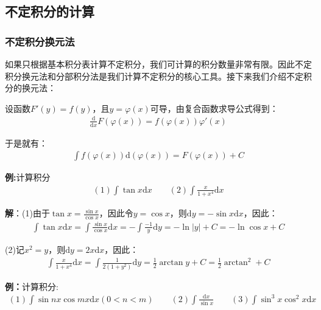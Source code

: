 \documentclass{ctexart}
\let\oldtextbf\textbf %
\renewcommand{\textbf}[1]{\textcolor{btex}{\oldtextbf{#1}}} %
\begin{document}
\subsection{不定积分的计算}
\subsubsection{不定积分换元法}
如果只根据基本积分表计算不定积分，我们可计算的积分数量非常有限。因此不定积分换元法和分部积分法是我们计算不定积分的核心工具。接下来我们介绍不定积分的换元法：
\begin{tcolorbox}[
    colback=bac1,     %
    colframe=fra1,   %
    coltitle=white,             %
    coltext=tex1,
    title=不定积分第一换元法,
    fonttitle=\bfseries,        %
arc=3mm,                     %
breakable
]
设函数$F'(y)=f(y)$，且$y=\varphi(x)$可导，由复合函数求导公式得到：
\begin{align*}
    \frac{\mathrm{d}}{\mathrm{d}x}F(\varphi(x))=f(\varphi(x))\varphi'(x)
\end{align*}

于是就有：
\begin{align*}
    \int f(\varphi(x))\mathrm{d}(\varphi(x))=F(\varphi(x))+C
\end{align*}
\end{tcolorbox}

\textbf{例:}计算积分
\begin{align*}
    (1)\int \tan x\mathrm{d}x\qquad (2)\int\frac{x}{1+x^4}\mathrm{d}x
\end{align*}

\textbf{解}：(1)由于$\tan x=\frac{\sin x}{\cos x}$，因此令$y=\cos x$，则$\mathrm{d}y=-\sin x\mathrm{d}x$，因此：
\begin{align*}
    \int \tan x\mathrm{d}x=\int\frac{\sin x}{\cos x}\mathrm{d}x=-\int\frac{-1}{y}\mathrm{d}y=-\ln |y|+C=-\ln \cos x+C
\end{align*}

(2)记$x^2=y$，则$\mathrm{d}y=2x\mathrm{d}x$，因此：
\begin{align*}
    \int\frac{x}{1+x^4}\mathrm{d}x=\int\frac{1}{2(1+y^2)}\mathrm{d}y=\frac{1}{2}\arctan y+C=\frac{1}{2}\arctan ^2+C
\end{align*}

\textbf{例：}计算积分:
\begin{align*}
    (1)\int \sin nx\cos mx\mathrm{d}x(0<n<m)\qquad(2)\int\frac{\mathrm{d}x}{\sin x}\qquad (3)\int \sin^3x\cos^2x\mathrm{d}x
\end{align*}
\end{document}
